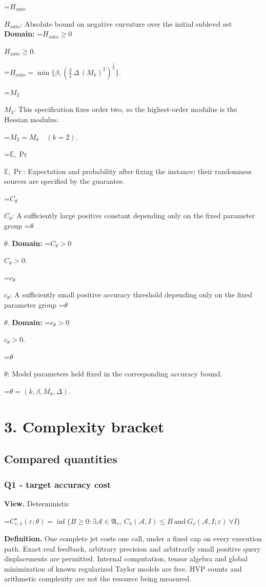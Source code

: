 \documentclass[10pt,a4paper]{article}
\newcommand{\AtlasMath}[1]{\par\begingroup\centering\setbox0=\hbox{$\displaystyle #1$}\ifdim\wd0>1.4\linewidth\typeout{ATLAS WIDE FORMULA: \the\wd0}\fi\ifdim\wd0>\linewidth\resizebox{\linewidth}{!}{\box0}\else\box0\fi\par\endgroup}
\newcommand{\AtlasInlineMath}[1]{\begingroup\setbox0=\hbox{$#1$}\ifdim\wd0>.4\linewidth\endgroup\AtlasMath{#1}\else\endgroup$#1$\fi}
\begin{document}
\AtlasInlineMath{H_{\mathrm{auto}}}: Absolute bound on negative curvature over the initial sublevel set \textbf{Domain:} \AtlasInlineMath{H_{\mathrm{auto}}\ge0}.


\AtlasMath{H_{\mathrm{auto}}=\min\{\beta,(\frac{3}{2}\,\Delta\,(M_k)^{2})^{\frac{1}{3}}\}.}


\AtlasInlineMath{M_2}: This specification fixes order two, so the highest-order modulus is the Hessian modulus.


\AtlasMath{M_2=M_k\quad(k=2).}


\AtlasInlineMath{\mathbb{E},\Pr}: Expectation and probability after fixing the instance; their randomness sources are specified by the guarantee.

\AtlasInlineMath{C_\theta}: A sufficiently large positive constant depending only on the fixed parameter group \AtlasInlineMath{\theta}. \textbf{Domain:} \AtlasInlineMath{C_\theta>0}.

\AtlasInlineMath{c_\theta}: A sufficiently small positive accuracy threshold depending only on the fixed parameter group \AtlasInlineMath{\theta}. \textbf{Domain:} \AtlasInlineMath{c_\theta>0}.

\AtlasInlineMath{\theta}: Model parameters held fixed in the corresponding accuracy bound.


\AtlasMath{\theta=(k,\beta,M_k,\Delta).}


\section{3. Complexity bracket}
\subsection{Compared quantities}
\subsubsection{Q1 - target accuracy cost}
\textbf{View.} Deterministic

\AtlasMath{C^\star_{v,\pi}(\varepsilon;\theta)=\inf\{B\ge0:\exists\mathcal A\in\mathfrak A_v,\ C_\pi(\mathcal A,I)\le B\ \text{and}\ G_v(\mathcal A,I;\varepsilon)\ \forall I\}}
\textbf{Definition.} One complete jet costs one call, under a fixed cap on every execution path. Exact real feedback, arbitrary precision and arbitrarily small positive query displacements are permitted. Internal computation, tensor algebra and global minimization of known regularized Taylor models are free. HVP counts and arithmetic complexity are not the resource being measured.
\end{document}
